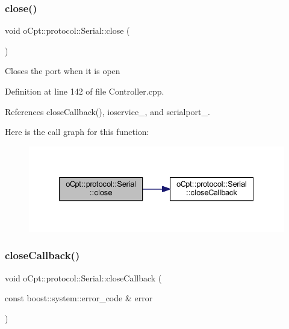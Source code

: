 \subsubsection{\texorpdfstring{close()}{close()}}
{\footnotesize\ttfamily void o\+Cpt\+::protocol\+::\+Serial\+::close (\begin{DoxyParamCaption}{ }\end{DoxyParamCaption})}

Closes the port when it is open 

Definition at line 142 of file Controller.\+cpp.



References close\+Callback(), ioservice\+\_\+, and serialport\+\_\+.

Here is the call graph for this function\+:\nopagebreak
\begin{figure}[H]
\begin{center}
\leavevmode
\includegraphics[width=332pt]{classo_cpt_1_1protocol_1_1_serial_a8c7e9cd0aaa7c31893cf4380e8148fec_cgraph}
\end{center}
\end{figure}
\hypertarget{classo_cpt_1_1protocol_1_1_serial_a3abae181678a125e420092465d063526}{}\label{classo_cpt_1_1protocol_1_1_serial_a3abae181678a125e420092465d063526} 
\subsubsection{\texorpdfstring{close\+Callback()}{closeCallback()}}
{\footnotesize\ttfamily void o\+Cpt\+::protocol\+::\+Serial\+::close\+Callback (\begin{DoxyParamCaption}\item[{const boost\+::system\+::error\+\_\+code \&}]{error }\end{DoxyParamCaption})\hspace{0.3cm}{\ttfamily [protected]}}

